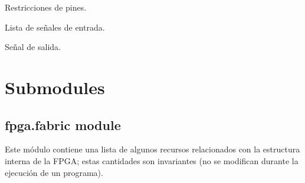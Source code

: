 \documentclass[letterpaper,10pt,english]{sphinxmanual}
\begin{document}
\begin{fulllineitems}
\begin{fulllineitems}
\end{fulllineitems}


\begin{fulllineitems}
\label{\detokenize{fpga:fpga.Lut6.pin}}
\pysigstartsignatures
{}
\pysigstopsignatures
\sphinxAtStartPar
Restricciones de pines.

\end{fulllineitems}


\begin{fulllineitems}
\label{\detokenize{fpga:fpga.Lut6.w_in}}
\pysigstartsignatures
{}
\pysigstopsignatures
\sphinxAtStartPar
Lista de señales de entrada.

\end{fulllineitems}


\begin{fulllineitems}
\label{\detokenize{fpga:fpga.Lut6.w_out}}
\pysigstartsignatures
{}
\pysigstopsignatures
\sphinxAtStartPar
Señal de salida.

\end{fulllineitems}


\end{fulllineitems}



\section{Submodules}
\label{\detokenize{fpga:submodules}}
\sphinxstepscope


\subsection{fpga.fabric module}
\label{\detokenize{fpga.fabric:module-fpga.fabric}}\label{\detokenize{fpga.fabric:fpga-fabric-module}}\label{\detokenize{fpga.fabric::doc}}
\sphinxAtStartPar
Este módulo contiene una lista de algunos recursos relacionados con la
estructura interna de la FPGA; estas cantidades son invariantes (no se
modifican durante la ejecución de un programa).
\end{document}

